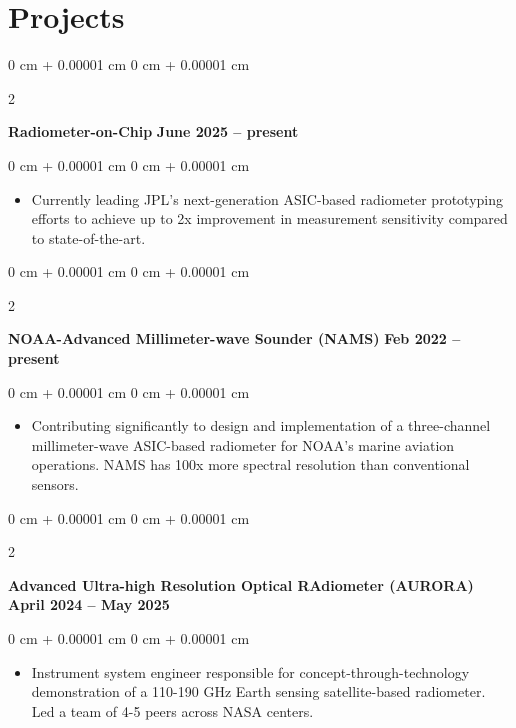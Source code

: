 \documentclass[10pt, letterpaper]{article}
\newenvironment{highlights}{
    \begin{itemize}[
        topsep=0.10 cm,
        parsep=0.10 cm,
        partopsep=0pt,
        itemsep=0pt,
        leftmargin=0 cm + 10pt     
    ]
}{
    \end{itemize}
} %
\newenvironment{onecolentry}{
    \begin{adjustwidth}{
        0 cm + 0.00001 cm
    }{
        0 cm + 0.00001 cm
    }
}{
    \end{adjustwidth}
} %
\newenvironment{twocolentry}[2][]{
    \onecolentry
    \def\secondColumn{#2}
    \setcolumnwidth{\fill, 4.5 cm}
    \begin{paracol}{2}
}{
    \switchcolumn \raggedleft \secondColumn
    \end{paracol}
    \endonecolentry
} %
\begin{document}
    \section{Projects}
       \justifying

        \begin{twocolentry}{
            \textbf{June 2025 -- present}
        }
            \textbf{Radiometer-on-Chip}\end{twocolentry}

        \vspace{0.20 cm}
        \begin{onecolentry}
            \begin{highlights}
                \item Currently leading JPL's next-generation ASIC-based radiometer prototyping efforts to achieve up to 2x improvement in  measurement sensitivity compared to state-of-the-art. 
            \end{highlights}
        \end{onecolentry}
        \vspace{0.3 cm}


        \begin{twocolentry}{
            \textbf{Feb 2022 -- present}
        }
            \textbf{NOAA-Advanced Millimeter-wave Sounder (NAMS)}\end{twocolentry}

        \vspace{0.20 cm}
        \begin{onecolentry}
            \begin{highlights}
                \item Contributing significantly to design and implementation  of a three-channel millimeter-wave ASIC-based radiometer for NOAA's marine aviation operations. NAMS has 100x more spectral resolution than conventional sensors. 
            \end{highlights}
        \end{onecolentry}
        \vspace{0.3 cm}


       \begin{twocolentry}{
            \textbf{April 2024 -- May 2025}
        }
            \textbf{Advanced Ultra-high Resolution Optical RAdiometer (AURORA)}\end{twocolentry}

        \vspace{0.20 cm}
        \begin{onecolentry}
            \begin{highlights}
                \item Instrument system engineer responsible for concept-through-technology demonstration of a 110-190 GHz Earth sensing satellite-based radiometer. Led a team of 4-5 peers across NASA centers.
            \end{highlights}
        \end{onecolentry}
        \vspace{0.3 cm}
\end{document}

